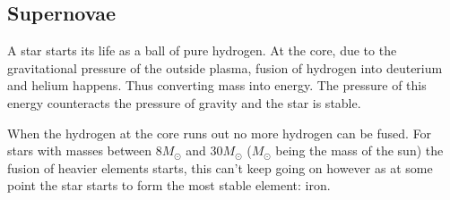 \documentclass[11pt,a4paper,faculty=we,language=en,doctype=report]{cls/ugent-doc}
\begin{document}
\subsection{Supernovae}
\label{sec:supernovae}
A star starts its life as a ball of pure hydrogen. At the core, due to the
gravitational pressure of the outside plasma, fusion of hydrogen into deuterium
and helium happens. Thus converting mass into energy. The pressure of this energy
counteracts the pressure of gravity and the star is stable.

When the hydrogen at the core runs out no more hydrogen can be fused. For stars
with masses between $8M_\odot$ and $30M_\odot$ ($M_\odot$ being the mass of the sun)
the fusion of heavier elements starts, this can't keep going on however as at
some point the star starts to form the most stable element: iron. 
\end{document}
